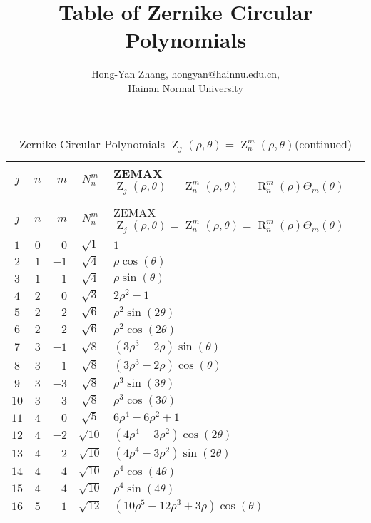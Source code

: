 \documentclass[11pt,a4paper]{article}
\title{Table of Zernike Circular Polynomials}
\author{Hong-Yan Zhang, hongyan@hainnu.edu.cn, \\ Hainan Normal University}
\DeclareMathOperator{\Zern}{Z}
\newcommand{\Zernpoly}[2]{\operatorname{Z}_{#1}^{#2}}
\newcommand{\Radipoly}[2]{\operatorname{R}_{#1}^{#2}}
\begin{document}
\maketitle


\begin{center}
\begin{longtable}{ccrcp{}}
\caption{Zernike Circular Polynomials $\Zern_j(\rho,\theta)=\Zernpoly{n}{m}(\rho,\theta)$}\\
\hline
$j$ & $n$ & $m$ & $N^m_n$ & ZEMAX $\Zern_j(\rho,\theta)=\Zernpoly{n}{m}(\rho,\theta)=\Radipoly{n}{m}(\rho)\Theta_m(\theta)$\\
\hline
\endfirsthead
\caption{Zernike Circular Polynomials $\Zern_j(\rho,\theta)=\Zernpoly{n}{m}(\rho,\theta)$(continued)}\\
\hline
$j$ & $n$ & $m$ & $N^m_n$ & ZEMAX $\Zern_j(\rho,\theta)=\Zernpoly{n}{m}(\rho,\theta)=\Radipoly{n}{m}(\rho)\Theta_m(\theta)$\\
\hline
\endhead
\hline
\endfoot
\hline
\endlastfoot
 $1$  & $0$  & $0$  &$\sqrt{1}$  &$1 $\\
 $2$  & $1$  & $-1$  &$\sqrt{4}$  &$\rho \cos(\theta)$\\
 $3$  & $1$  & $1$  &$\sqrt{4}$  &$\rho \sin(\theta)$\\
 $4$  & $2$  & $0$  &$\sqrt{3}$  &$2\rho^{2} -1 $\\
 $5$  & $2$  & $-2$  &$\sqrt{6}$  &$\rho^{2} \sin(2\theta)$\\
 $6$  & $2$  & $2$  &$\sqrt{6}$  &$\rho^{2} \cos(2\theta)$\\
 $7$  & $3$  & $-1$  &$\sqrt{8}$  &$(3\rho^{3} -2\rho )\sin(\theta)$\\
 $8$  & $3$  & $1$  &$\sqrt{8}$  &$(3\rho^{3} -2\rho )\cos(\theta)$\\
 $9$  & $3$  & $-3$  &$\sqrt{8}$  &$\rho^{3} \sin(3\theta)$\\
 $10$  & $3$  & $3$  &$\sqrt{8}$  &$\rho^{3} \cos(3\theta)$\\
 $11$  & $4$  & $0$  &$\sqrt{5}$  &$6\rho^{4} -6\rho^{2} +1 $\\
 $12$  & $4$  & $-2$  &$\sqrt{10}$  &$(4\rho^{4} -3\rho^{2} )\cos(2\theta)$\\
 $13$  & $4$  & $2$  &$\sqrt{10}$  &$(4\rho^{4} -3\rho^{2} )\sin(2\theta)$\\
 $14$  & $4$  & $-4$  &$\sqrt{10}$  &$\rho^{4} \cos(4\theta)$\\
 $15$  & $4$  & $4$  &$\sqrt{10}$  &$\rho^{4} \sin(4\theta)$\\
 $16$  & $5$  & $-1$  &$\sqrt{12}$  &$(10\rho^{5} -12\rho^{3} +3\rho )\cos(\theta)$\\

\end{longtable}
\end{center}
\end{document}
